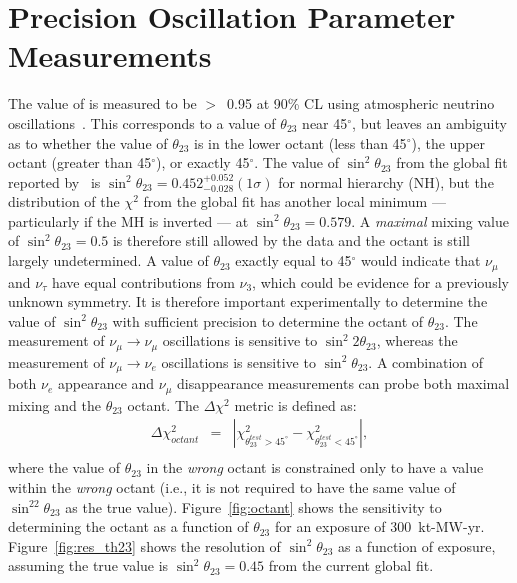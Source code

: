 \section{Precision Oscillation Parameter Measurements}

The value of  is measured to be $>$~0.95 at 90\% CL 
using atmospheric neutrino oscillations~\cite{Abe:2011ph}. 
This corresponds to a value of 
$\theta_{23}$ near 45\mbox{$^{\circ}$}, but leaves an ambiguity
as to whether the value of $\theta_{23}$ is in the lower octant 
(less than 45\mbox{$^{\circ}$}), the upper octant (greater than 45\mbox{$^{\circ}$}),
or exactly 45\mbox{$^{\circ}$}. 
The value of $\sin^2 \theta_{23}$ from
the global fit reported by~\cite{Gonzalez-Garcia:2014bfa} is $\sin ^2 \theta_{23} = 0.452
^{+0.052} _{-0.028} (1 \sigma)$ for normal hierarchy (NH), but the distribution of the $\chi^2$ from
the global fit has another local minimum --- particularly if the MH 
is inverted --- at $\sin^2 \theta_{23} = 0.579$. A
\emph{maximal} mixing value of $\sin^2 \theta_{23} =0.5$ is therefore still allowed
by the data and the octant is still largely undetermined.
A value of $\theta_{23}$ exactly equal to 45\mbox{$^{\circ}$} would indicate that 
$\nu_{\mu}$ and $\nu_{\tau}$ have equal contributions from $\nu_3$,
which could be evidence for a previously unknown symmetry. 
It is
therefore important experimentally to determine the value of
$\sin ^2 \theta_{23}$ 
with sufficient precision to determine 
the octant of $\theta_{23}$. 
The measurement of $\nu_\mu \rightarrow \nu_\mu$ oscillations is
sensitive to $\sin ^2 2 \theta_{23}$, whereas the measurement of
$\nu_\mu \rightarrow \nu_e$ oscillations is sensitive to $\sin^2
\theta_{23}$. 
A combination of both $\nu_e$ appearance and $\nu_\mu$ disappearance
measurements can probe both maximal mixing and the $\theta_{23}$
octant.  The $\Delta\chi^2$ metric is defined as:
\begin{eqnarray}
\Delta\chi^2_{octant} & = & |\chi^2_{\theta_{23}^{test}>45^\circ} - \chi^2_{\theta_{23}^{test}<45^\circ}|, \\ \nonumber
\end{eqnarray}
where the value of $\theta_{23}$ in the \emph{wrong} octant is constrained 
only to have a value within the \emph{wrong} octant (i.e., it is not required
to have the same value of $\sin^22\theta_{23}$ as the true value).
Figure~\ref{fig:octant} shows the sensitivity to determining the octant as a function of $\theta_{23}$ for an exposure of 300~kt-MW-yr.  Figure~\ref{fig:res_th23} shows the resolution of $\sin^2\theta_{23}$ as a function of exposure, assuming the true value is $\sin^2\theta_{23} = 0.45$ from the current global fit.

